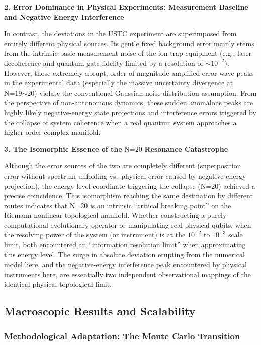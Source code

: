 \textbf{2. Error Dominance in Physical Experiments: Measurement Baseline
and Negative Energy Interference}

In contrast, the deviations in the USTC experiment are superimposed from
entirely different physical sources. Its gentle fixed background error
mainly stems from the intrinsic basic measurement noise of the ion-trap
equipment (e.g., laser decoherence and quantum gate fidelity limited by
a resolution of \(\text{∼}\text{10}^{\text{−2}}\)). However, those
extremely abrupt, order-of-magnitude-amplified error wave peaks in the
experimental data (especially the massive uncertainty divergence at
\(\text{N}\text{=19∼20}\)) violate the conventional Gaussian noise
distribution assumption. From the perspective of non-autonomous
dynamics, these sudden anomalous peaks are highly likely negative-energy
state projections and interference errors triggered by the collapse of
system coherence when a real quantum system approaches a higher-order
complex manifold.

\textbf{3. The Isomorphic Essence of the} \(\text{N}\text{=20}\)
\textbf{Resonance Catastrophe}

Although the error sources of the two are completely different
(superposition error without spectrum unfolding vs.~physical error
caused by negative energy projection), the energy level coordinate
triggering the collapse (\(\text{N}\text{=20}\)) achieved a precise
coincidence. This isomorphism reaching the same destination by different
routes indicates that \(\text{N}\text{=20}\) is an intrinsic ``critical
breaking point'' on the Riemann nonlinear topological manifold. Whether
constructing a purely computational evolutionary operator or
manipulating real physical qubits, when the resolving power of the
system (or instrument) is at the \(\text{10}^{\text{−2}}\) to
\(\text{10}^{\text{−3}}\) scale limit, both encountered an ``information
resolution limit'' when approximating this energy level. The surge in
absolute deviation erupting from the numerical model here, and the
negative-energy interference peak encountered by physical instruments
here, are essentially two independent observational mappings of the
identical physical topological limit.

\subsection*{Macroscopic Results and Scalability}

\subsubsection*{Methodological Adaptation: The Monte Carlo Transition}

